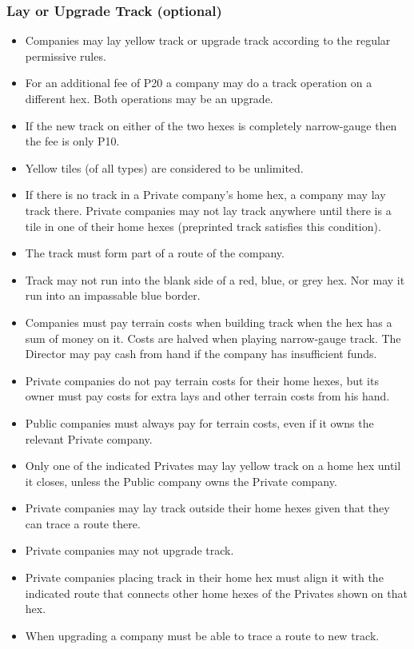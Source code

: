 \documentclass[a4paper,twocolumn]{article}
\begin{document}
\subsubsection{Lay or Upgrade Track (optional)}
\begin{itemize}
	\item Companies may lay yellow track or upgrade track according to the
	regular permissive rules.
	\item For an additional fee of P20 a company may do a track operation on a
	different hex. Both operations may be an upgrade.
	\item If the new track on either of the two hexes is completely narrow-gauge
	then the fee is only P10.
	\item Yellow tiles (of all types) are considered to be unlimited.
	\item If there is no track in a Private company's home hex, a company may
	lay track there. Private companies may not lay track anywhere until there is
	a tile in one of their home hexes (preprinted track satisfies this
	condition).
	\item The track must form part of a route of the company.
	\item Track may not run into the blank side of a red, blue, or grey hex. Nor
	may it run into an impassable blue border.
	\item Companies must pay terrain costs when building track when the hex has
	a sum of money on it. Costs are halved when playing narrow-gauge track. The
	Director may pay cash from hand if the company has insufficient funds.
	\item Private companies do not pay terrain costs for their home hexes, but
	its owner must pay costs for extra lays and other terrain costs from his
	hand.
	\item Public companies must always pay for terrain costs, even if it owns
	the relevant Private company.
	\item Only one of the indicated Privates may lay yellow track on a home hex
	until it closes, unless the Public company owns the Private company.
	\item Private companies may lay track outside their home hexes given that
	they can trace a route there.
	\item Private companies may not upgrade track.
	\item Private companies placing track in their home hex must align it with
	the indicated route that connects other home hexes of the Privates shown on
	that hex.
	\item When upgrading a company must be able to trace a route to new track.

\end{itemize}
\end{document}
